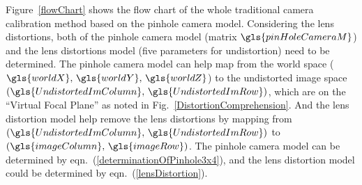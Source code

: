 Figure~\ref{flowChart} shows the flow chart of the whole traditional camera calibration method based on the pinhole camera model. Considering the lens distortions, both of the pinhole camera model (matrix \(\gls{pinHoleCameraM}\)) and the lens distortions model (five parameters for undistortion) need to be determined. The pinhole camera model can help map from the world space (\(\gls{worldX}, \, \gls{worldY}, \, \gls{worldZ}\)) to the undistorted image space  \((\gls{UndistortedImColumn} , \, \gls{UndistortedImRow})\), which are on the \enquote{Virtual Focal Plane} as noted in Fig.~\ref{DistortionComprehension}. And the lens distortion model help remove the lens distortions by mapping from  \((\gls{UndistortedImColumn} , \, \gls{UndistortedImRow})\) to \((\gls{imageColumn}, \, \gls{imageRow} )\). The pinhole camera model can be determined by eqn.~(\ref{determinationOfPinhole3x4}), and the lens distortion model could be determined by eqn.~(\ref{lensDistortion}).




%
%
%



















